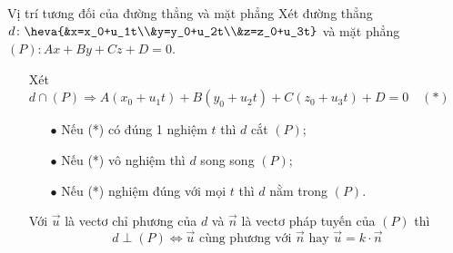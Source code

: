 \begin{dang}{Vị trí tương đối của đường thẳng và mặt phẳng}
	Xét đường thẳng $d \colon \heva{&x=x_0+u_1t\\&y=y_0+u_2t\\&z=z_0+u_3t}$ và mặt phẳng $(P) \colon Ax + By + Cz + D =0$.
	\begin{itemize}
		\item [\iconMT]  Xét $d \cap (P) \Rightarrow A(x_0+u_1t)+B(y_0+u_2t)+C(z_0+u_3t)+D=0 \quad (*)$
		\begin{boxdn}
			\begin{itemize}
				\item [$\bullet$] Nếu (*) có đúng 1 nghiệm $t$ thì $d$ cắt $(P)$;
				\item [$\bullet$] Nếu (*) vô nghiệm  thì $d$ song song $(P)$;
				\item [$\bullet$] Nếu (*) nghiệm đúng với mọi $t$ thì $d$ nằm trong $(P)$.
			\end{itemize}
		\end{boxdn}
		\item [\iconMT]  Với $\vec{u}$ là vectơ chỉ phương của $d$ và $\vec{n}$ là vectơ pháp tuyến của $(P)$ thì
		$$d \perp (P) \Leftrightarrow \vec{u} \text{ cùng phương với } \vec{n} \text{ hay } \vec{u}=k \cdot\vec{n}$$
	\end{itemize}
\end{dang}
\setcounter{vd}{0}

